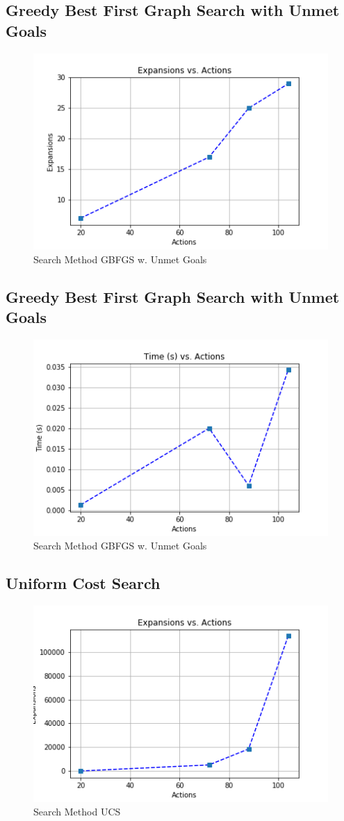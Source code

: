 \documentclass[a4paper]{article}
\begin{document}
\subsection{Greedy Best First Graph Search with Unmet Goals}

\begin{figure}[htpb]
\begin{center}
\includegraphics[width=0.5\columnwidth]{fig/results_334.png}
\caption{Search Method GBFGS w. Unmet Goals}
\end{center}
\label{fig334}
\end{figure}
        

\subsection{Greedy Best First Graph Search with Unmet Goals}

\begin{figure}[htpb]
\begin{center}
\includegraphics[width=0.5\columnwidth]{fig/results_331.png}
\caption{Search Method GBFGS w. Unmet Goals}
\end{center}
\label{fig331}
\end{figure}
        

\subsection{Uniform Cost Search}

\begin{figure}[htpb]
\begin{center}
\includegraphics[width=0.5\columnwidth]{fig/results_434.png}
\caption{Search Method UCS}
\end{center}
\label{fig434}
\end{figure}
        
\end{document}
